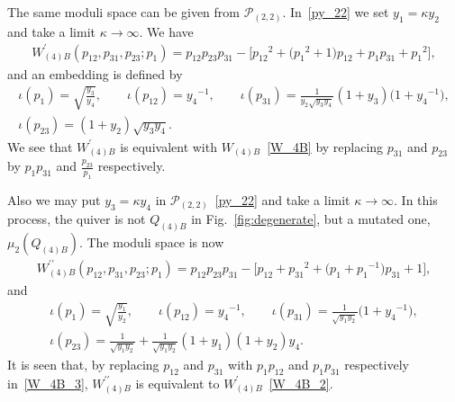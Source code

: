 \documentclass[10pt,a4paper]{amsart}
\numberwithin{equation}{section}
\begin{document}
The same moduli space can be given from $\mathcal{P}_{(2,2)}$. In~\eqref{py_22} we set $y_1=\kappa y_2$ and take a limit $\kappa\to\infty$. We have
\begin{gather} \label{W_4B_2}
 W^\prime_{(4)B}(p_{12}, p_{31}, p_{23} ; p_1) = p_{12} p_{23} p_{31} - \big[ {p_{12}}^2 + \big( {p_1}^2 +1 \big) p_{12} + p_1 p_{31} + {p_1}^2 \big] ,
\end{gather}
and an embedding is defined by
\begin{gather*}
\iota(p_1) = \sqrt{\frac{y_3}{y_4}} ,\qquad \iota(p_{12}) = {y_4}^{-1} ,\qquad \iota(p_{31}) = \frac{1}{y_2 \sqrt{y_3 y_4}} (1+y_3 ) \big( 1+ {y_4}^{-1} \big) , \\
 \iota(p_{23}) = (1+y_2) \sqrt{y_3 y_4} .
\end{gather*}
We see that $W^\prime_{(4)B}$ is equivalent with $W_{(4)B}$~\eqref{W_4B} by replacing $p_{31}$ and $p_{23}$ by $p_1 p_{31}$ and $\frac{p_{23}}{p_1}$ respectively.

Also we may put $ y_3 = \kappa y_4$ in $\mathcal{P}_{(2,2)}$~\eqref{py_22} and take a limit $\kappa\to\infty$. In this process, the quiver is not $Q_{(4)B}$ in Fig.~\ref{fig:degenerate}, but a mutated one, $\mu_2(Q_{(4)B})$. The moduli space is now
\begin{gather} \label{W_4B_3}
 W_{(4)B}^{\prime\prime}(p_{12}, p_{31}, p_{23}; p_1) = p_{12} p_{23} p_{31} - \big[ p_{12} + {p_{31}}^2 +\big( p_1+{p_1}^{-1} \big) p_{31} + 1 \big],
\end{gather}
and
\begin{gather*}
 \iota(p_1) = \sqrt{\frac{y_1}{y_2}} , \qquad \iota(p_{12}) = {y_4}^{-1},\qquad \iota(p_{31}) = \frac{1}{\sqrt{y_1 y_2}} \big( 1+{y_4}^{-1} \big) ,\\
 \iota(p_{23}) = \frac{1}{\sqrt{y_1 y_2}} + \frac{1}{\sqrt{y_1 y_2}} ( 1+y_1 ) ( 1+y_2 ) y_4 .
\end{gather*}
It is seen that, by replacing $p_{12}$ and $p_{31}$ with $p_1 p_{12}$ and $p_1 p_{31}$ respectively in~\eqref{W_4B_3}, $W^{\prime\prime}_{(4)B}$ is equivalent to $W^\prime_{(4)B}$~\eqref{W_4B_2}.
\end{document}
